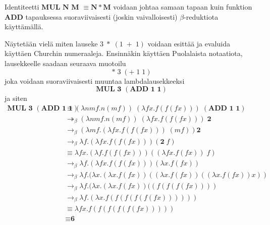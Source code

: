 \begin{esim}
Identiteetti $\textbf{MUL N M } \equiv \textbf{N} * \textbf{M}$ voidaan johtaa samaan tapaan kuin funktion \textbf{ADD} tapauksessa suoraviivaisesti (joskin vaivalloisesti) $\beta$-reduktiota käyttämällä. 
\par
Näytetään vielä miten lauseke $3 \; * \; (1  \; + \; 1)$ voidaan esittää ja evaluida käyttäen Churchin numeraaleja. Ensinnäkin käyttäen Puolalaista notaatiota, lausekkeelle saadaan seuraava muotoilu
\[* \; 3 \; (+ \; 1 \; 1) \] 
joka voidaan suoraviivaisesti muuntaa lambdalausekkeeksi
\[ \textbf{MUL 3 }(\textbf{ADD 1 1}) \]
ja siten
\begin{align*}
\textbf{MUL 3 }(\textbf{ADD 1 1}) &\equiv (\lambda n m f . n (mf))  \; (\lambda f x . f(f(fx))) \;(\textbf{ADD 1 1}) \\
&\twoheadrightarrow_{\beta} (\lambda n m f . n (mf) ) \; (\lambda f x . f(f(fx))) \; \textbf{2} \\
&\rightarrow_{\beta} (\lambda m f . (\lambda f x . f(f(fx))) \; (m f)) \textbf{2}    \\
&\rightarrow_{\beta} \lambda f . (\lambda f x . f(f(fx))) (\textbf{2} \; f) \\
&\equiv \lambda f x . (\lambda f . f(f(fx))) ((\lambda f x . f (f x)) \; f) \\
&\rightarrow_{\beta} \lambda f . (\lambda f x .  f(f(fx))) (\lambda x . f (f x)) \\
&\rightarrow_{\beta} \lambda f . (\lambda x .  (\lambda x . f (f x))((\lambda x . f (f x))((\lambda x . f (f x))x))\\
&\rightarrow_{\beta} \lambda f . (\lambda x .  (\lambda x . f (f x))((f (f( f( f x))))  \\
&\rightarrow_{\beta} \lambda f . (\lambda x . f( f (f (f( f( f x)))))) \\
&\equiv \lambda f x. f( f (f (f( f( f x))))) \\
&\equiv \textbf{6}
\end{align*} 
\end{esim}   

